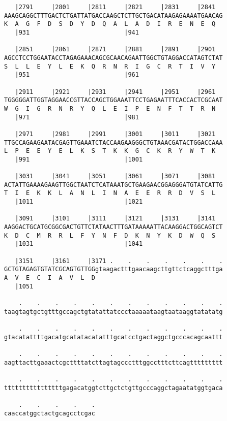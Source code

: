 \documentclass{article}
\begin{document}
\begin{Verbatim}
   |2791     |2801     |2811     |2821     |2831     |2841  
AAAGCAGGCTTTGACTCTGATTATGACCAAGCTCTTGCTGACATAAGAGAAAATGAACAG
K  A  G  F  D  S  D  Y  D  Q  A  L  A  D  I  R  E  N  E  Q  
   |931                          |941                       
  
   |2851     |2861     |2871     |2881     |2891     |2901  
AGCCTCCTGGAATACCTAGAGAAACAGCGCAACAGAATTGGCTGTAGGACCATAGTCTAT
S  L  L  E  Y  L  E  K  Q  R  N  R  I  G  C  R  T  I  V  Y  
   |951                          |961                       
  
   |2911     |2921     |2931     |2941     |2951     |2961  
TGGGGGATTGGTAGGAACCGTTACCAGCTGGAAATTCCTGAGAATTTCACCACTCGCAAT
W  G  I  G  R  N  R  Y  Q  L  E  I  P  E  N  F  T  T  R  N  
   |971                          |981                       
  
   |2971     |2981     |2991     |3001     |3011     |3021  
TTGCCAGAAGAATACGAGTTGAAATCTACCAAGAAGGGCTGTAAACGATACTGGACCAAA
L  P  E  E  Y  E  L  K  S  T  K  K  G  C  K  R  Y  W  T  K  
   |991                          |1001                      
  
   |3031     |3041     |3051     |3061     |3071     |3081  
ACTATTGAAAAGAAGTTGGCTAATCTCATAAATGCTGAAGAACGGAGGGATGTATCATTG
T  I  E  K  K  L  A  N  L  I  N  A  E  E  R  R  D  V  S  L  
   |1011                         |1021                      
  
   |3091     |3101     |3111     |3121     |3131     |3141  
AAGGACTGCATGCGGCGACTGTTCTATAACTTTGATAAAAATTACAAGGACTGGCAGTCT
K  D  C  M  R  R  L  F  Y  N  F  D  K  N  Y  K  D  W  Q  S  
   |1031                         |1041                      
  
   |3151     |3161     |3171 .    .    .    .    .    .    .
GCTGTAGAGTGTATCGCAGTGTTGGgtaagactttgaacaagcttgttctcaggctttga
A  V  E  C  I  A  V  L  D                                   
   |1051                                                    
  
    .    .    .    .    .    .    .    .    .    .    .    .
taagtagtgctgtttgccagctgtatattatccctaaaaataagtaataaggtatatatg
  
    .    .    .    .    .    .    .    .    .    .    .    .
gtacatattttgacatgcatatacatatttgcatcctgactaggctgcccacagcaattt
  
    .    .    .    .    .    .    .    .    .    .    .    .
aagttacttgaaactcgcttttatcttagtagccctttggcctttcttcagttttttttt
  
    .    .    .    .    .    .    .    .    .    .    .    .
ttttttttttttttttgagacatggtcttgctctgttgcccaggctagaatatggtgaca
  
    .    .    .    .    .
caaccatggctactgcagcctcgac
\end{Verbatim}
\end{document}
